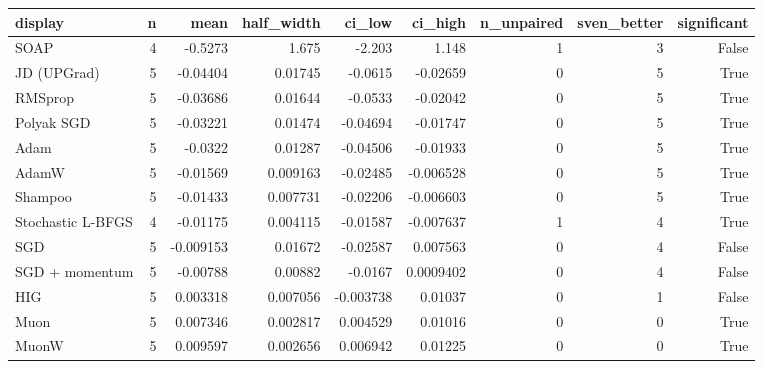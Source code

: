 \begin{tabular}{lrrrrrrrr}
\toprule
display & n & mean & half\_width & ci\_low & ci\_high & n\_unpaired & sven\_better & significant \\
\midrule
SOAP & 4 & -0.5273 & 1.675 & -2.203 & 1.148 & 1 & 3 & False \\
JD (UPGrad) & 5 & -0.04404 & 0.01745 & -0.0615 & -0.02659 & 0 & 5 & True \\
RMSprop & 5 & -0.03686 & 0.01644 & -0.0533 & -0.02042 & 0 & 5 & True \\
Polyak SGD & 5 & -0.03221 & 0.01474 & -0.04694 & -0.01747 & 0 & 5 & True \\
Adam & 5 & -0.0322 & 0.01287 & -0.04506 & -0.01933 & 0 & 5 & True \\
AdamW & 5 & -0.01569 & 0.009163 & -0.02485 & -0.006528 & 0 & 5 & True \\
Shampoo & 5 & -0.01433 & 0.007731 & -0.02206 & -0.006603 & 0 & 5 & True \\
Stochastic L-BFGS & 4 & -0.01175 & 0.004115 & -0.01587 & -0.007637 & 1 & 4 & True \\
SGD & 5 & -0.009153 & 0.01672 & -0.02587 & 0.007563 & 0 & 4 & False \\
SGD + momentum & 5 & -0.00788 & 0.00882 & -0.0167 & 0.0009402 & 0 & 4 & False \\
HIG & 5 & 0.003318 & 0.007056 & -0.003738 & 0.01037 & 0 & 1 & False \\
Muon & 5 & 0.007346 & 0.002817 & 0.004529 & 0.01016 & 0 & 0 & True \\
MuonW & 5 & 0.009597 & 0.002656 & 0.006942 & 0.01225 & 0 & 0 & True \\
\bottomrule
\end{tabular}
